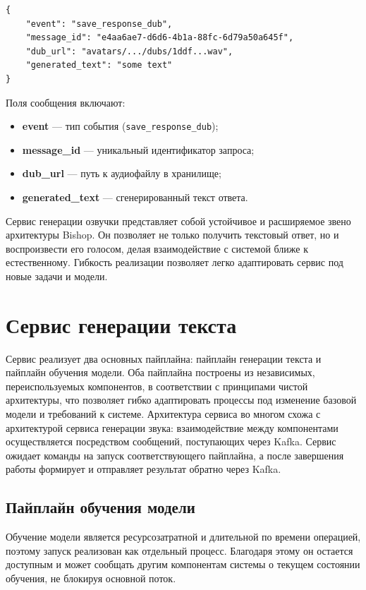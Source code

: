 \begin{lstlisting}[style=jsonstyle, numbers=none, frame=none]
{
    "event": "save_response_dub",
    "message_id": "e4aa6ae7-d6d6-4b1a-88fc-6d79a50a645f",
    "dub_url": "avatars/.../dubs/1ddf...wav",
    "generated_text": "some text"
}
\end{lstlisting}

Поля сообщения включают:
\begin{itemize}
\item \textbf{event} — тип события (\texttt{save\_response\_dub});
\item \textbf{message\_id} — уникальный идентификатор запроса;
\item \textbf{dub\_url} — путь к аудиофайлу в хранилище;
\item \textbf{generated\_text} — сгенерированный текст ответа.
\end{itemize}


Сервис генерации озвучки представляет собой устойчивое и расширяемое звено
архитектуры Bishop. Он позволяет не только получить текстовый ответ, но и
воспроизвести его голосом, делая взаимодействие с системой ближе к
естественному. Гибкость реализации позволяет легко адаптировать сервис под
новые задачи и модели.


\section{Сервис генерации текста}
Сервис реализует два основных пайплайна: пайплайн генерации текста и пайплайн обучения модели. Оба пайплайна построены из независимых, переиспользуемых компонентов, в соответствии с принципами чистой архитектуры, что позволяет гибко адаптировать процессы под изменение базовой модели и требований к системе. Архитектура сервиса во многом схожа с архитектурой сервиса генерации звука: взаимодействие между компонентами осуществляется посредством сообщений, поступающих через Kafka. Сервис ожидает команды на запуск соответствующего пайплайна, а после завершения работы формирует и отправляет результат обратно через Kafka.

\subsection{Пайплайн обучения модели}
Обучение модели является ресурсозатратной и длительной по времени операцией, поэтому запуск реализован как отдельный процесс. Благодаря этому он остается доступным и может сообщать другим компонентам системы о текущем состоянии обучения, не блокируя основной поток.

